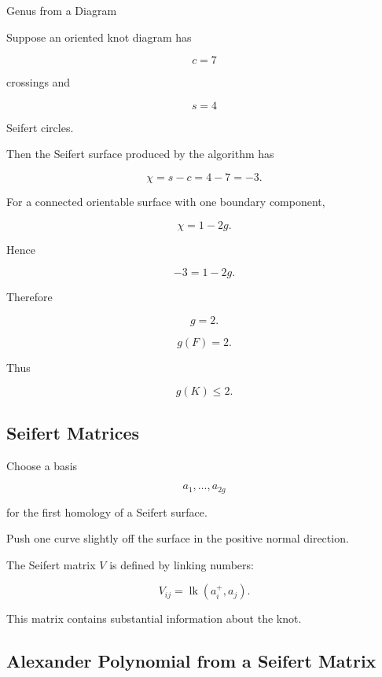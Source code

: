\begin{workedexamplebox}{Genus from a Diagram}

Suppose an oriented knot diagram has

\[
c=7
\]

crossings and

\[
s=4
\]

Seifert circles.

Then the Seifert surface produced by the algorithm has

\[
\chi=s-c=4-7=-3.
\]

For a connected orientable surface with one boundary component,

\[
\chi=1-2g.
\]

Hence

\[
-3=1-2g.
\]

Therefore

\[
g=2.
\]

\begin{answerbox}
\[
\boxed{
g(F)=2.
}
\]

Thus

\[
\boxed{
g(K)\leq2.
}
\]
\end{answerbox}
\end{workedexamplebox}

\subsection{Seifert Matrices}
\label{subsec:seifert-matrices}

Choose a basis

\[
a_1,\ldots,a_{2g}
\]

for the first homology of a Seifert surface.

Push one curve slightly off the surface in the positive normal direction.

The Seifert matrix \(V\) is defined by linking numbers:

\[
\boxed{
V_{ij}
=
\operatorname{lk}(a_i^+,a_j).
}
\]

This matrix contains substantial information about the knot.

\subsection{Alexander Polynomial from a Seifert Matrix}
\label{subsec:alexander-seifert-matrix}

